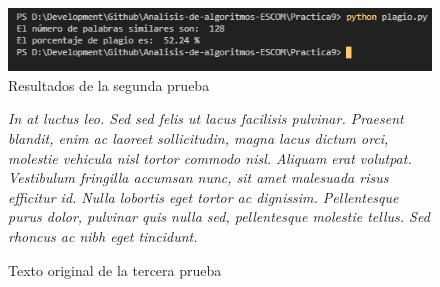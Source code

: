 \documentclass[12pt,twoside]{article}
\begin{document}
\begin{figure}[ht]
    \centering
    \includegraphics[width=1\textwidth]{2.png}
    \caption{Resultados de la segunda prueba} 
    \label{fig:segunda}
\end{figure}


\begin{figure}
    \centering
    \textit{In at luctus leo. Sed sed felis ut lacus 
facilisis pulvinar. Praesent blandit, enim ac laoreet sollicitudin, 
magna lacus dictum orci, molestie vehicula nisl tortor commodo nisl. 
Aliquam erat volutpat.}
\textit{Vestibulum fringilla 
accumsan nunc, sit amet malesuada risus efficitur id. Nulla 
lobortis eget tortor ac dignissim. Pellentesque purus dolor, 
pulvinar quis nulla sed, pellentesque molestie tellus. Sed rhoncus 
ac nibh eget tincidunt.}
    \caption{Texto original de la tercera prueba}
    \label{fig:texto31}
\end{figure}
\end{document}
